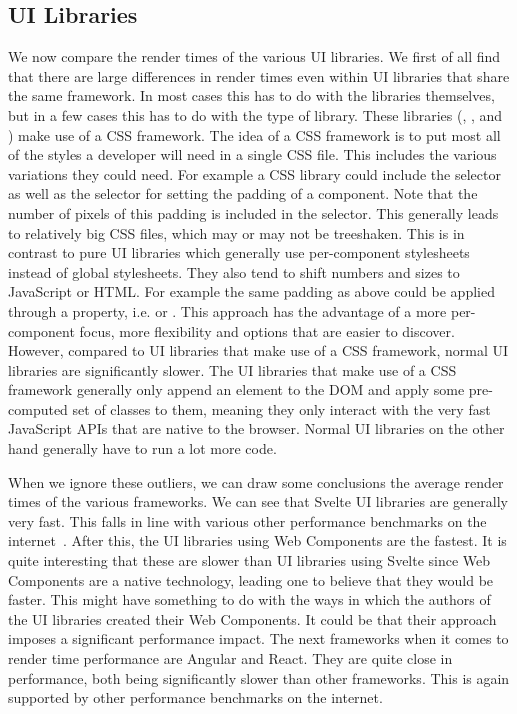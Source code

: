 \subsection{UI Libraries}
We now compare the render times of the various UI libraries. We first of all find that there are large differences in render times even within UI libraries that share the same framework. In most cases this has to do with the libraries themselves, but in a few cases this has to do with the type of library. These libraries (, , and ) make use of a CSS framework. The idea of a CSS framework is to put most all of the styles a developer will need in a single CSS file. This includes the various variations they could need. For example a CSS library could include the  selector as well as the  selector for setting the padding of a component. Note that the number of pixels of this padding is included in the selector. This generally leads to relatively big CSS files, which may or may not be treeshaken. This is in contrast to pure UI libraries which generally use per-component stylesheets instead of global stylesheets. They also tend to shift numbers and sizes to JavaScript or HTML\@. For example the same padding as above could be applied through a property, i.e.  or . This approach has the advantage of a more per-component focus, more flexibility and options that are easier to discover. However, compared to UI libraries that make use of a CSS framework, normal UI libraries are significantly slower. The UI libraries that make use of a CSS framework generally only append an element to the DOM and apply some pre-computed set of classes to them, meaning they only interact with the very fast JavaScript APIs that are native to the browser. Normal UI libraries on the other hand generally have to run a lot more code.

When we ignore these outliers, we can draw some conclusions the average render times of the various frameworks. We can see that Svelte UI libraries are generally very fast. This falls in line with various other performance benchmarks on the internet~. After this, the UI libraries using Web Components are the fastest. It is quite interesting that these are slower than UI libraries using Svelte since Web Components are a native technology, leading one to believe that they would be faster. This might have something to do with the ways in which the authors of the UI libraries created their Web Components. It could be that their approach imposes a significant performance impact. The next frameworks when it comes to render time performance are Angular and React. They are quite close in performance, both being significantly slower than other frameworks. This is again supported by other performance benchmarks on the internet.

